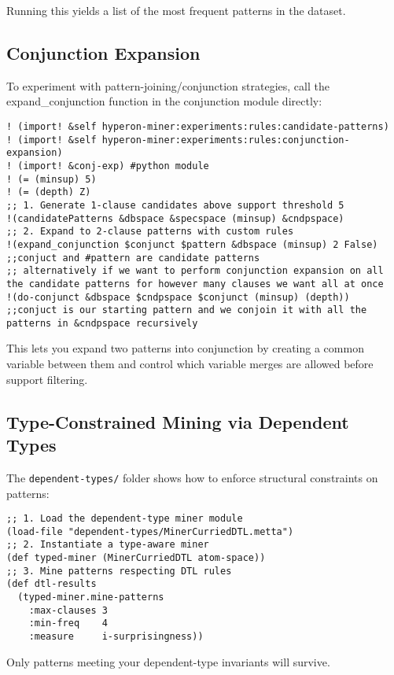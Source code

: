 \documentclass{article}
\begin{document}
Running this yields a list of the most frequent patterns in the dataset.

\subsection{Conjunction Expansion}

To experiment with pattern-joining/conjunction strategies, call the expand_conjunction function in the conjunction module directly:

\begin{verbatim}
! (import! &self hyperon-miner:experiments:rules:candidate-patterns)
! (import! &self hyperon-miner:experiments:rules:conjunction-expansion)
! (import! &conj-exp) #python module 
! (= (minsup) 5)
! (= (depth) Z)
;; 1. Generate 1-clause candidates above support threshold 5
!(candidatePatterns &dbspace &specspace (minsup) &cndpspace)
;; 2. Expand to 2-clause patterns with custom rules
!(expand_conjunction $conjunct $pattern &dbspace (minsup) 2 False) 
;;conjuct and #pattern are candidate patterns
;; alternatively if we want to perform conjunction expansion on all the candidate patterns for however many clauses we want all at once
!(do-conjunct &dbspace $cndpspace $conjunct (minsup) (depth)) 
;;conjuct is our starting pattern and we conjoin it with all the patterns in &cndpspace recursively
\end{verbatim}

This lets you expand two patterns into conjunction by creating a common variable between them and control which variable merges are allowed before support filtering.

\subsection{Type-Constrained Mining via Dependent Types}

The \texttt{dependent-types/} folder shows how to enforce structural constraints on patterns:

\begin{verbatim}
;; 1. Load the dependent-type miner module
(load-file "dependent-types/MinerCurriedDTL.metta")
;; 2. Instantiate a type-aware miner
(def typed-miner (MinerCurriedDTL atom-space))
;; 3. Mine patterns respecting DTL rules
(def dtl-results
  (typed-miner.mine-patterns
    :max-clauses 3
    :min-freq    4
    :measure     i-surprisingness))
\end{verbatim}

Only patterns meeting your dependent-type invariants will survive.
\end{document}
